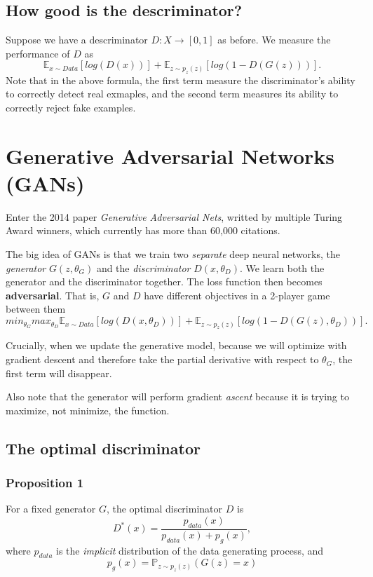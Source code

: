 \documentclass[titlepage, 12pt, leqno]{article}
\begin{document}
\subsection{How good is the descriminator?}
Suppose we have a descriminator $D:X \rightarrow [0,1]$ as before. We measure
the performance of $D$ as
\[
    \mathbb{E}_{x \sim Data}[log(D(x))]+\mathbb{E}_{z \sim p_{z}(z)}[log(1 - D(G(z)))].
\]
Note that in the above formula, the first term measure the discriminator's
ability to correctly detect real exmaples, and the second term measures its
ability to correctly reject fake examples.

\pagebreak
\section{Generative Adversarial Networks (GANs)}
Enter the 2014 paper \textit{Generative Adversarial Nets}, writted by multiple
Turing Award winners, which currently has more than 60,000 citations.

The big idea of GANs is that we train two \textit{separate} deep neural networks,
the \textit{generator} $G(z,\theta_{G})$ and the \textit{discriminator}
$D(x,\theta_{D})$. We learn both the generator and the discriminator together. 
The loss function then becomes \textbf{adversarial}. That is, $G$ and $D$ have
different objectives in a 2-player game between them
\[
min_{\theta_{G}}max_{\theta_{D}} \mathbb{E}_{x \sim Data}[log(D(x, 
\theta_{D}))]+\mathbb{E}_{z \sim p_{z}(z)}[log(1 - D(G(z), \theta_{D}))].
\]

\begin{note}
Crucially, when we update the generative model, because we will optimize with
gradient descent and therefore take the partial derivative with respect to
$\theta_{G}$, the first term will disappear.
\end{note}

\begin{note}
    Also note that the generator will perform gradient \textit{ascent} because
    it is trying to maximize, not minimize, the function.
\end{note}

\subsection{The optimal discriminator}
\subsubsection{Proposition 1}
For a fixed generator $G$, the optimal discriminator $D$ is
\[
D^{*}(x) = \frac{p_{data}(x)}{p_{data}(x) + p_{g}(x)},
\]
where $p_{data}$ is the \textit{implicit} distribution of the data generating
process, and 
\[
p_{g}(x) = \mathbb{P}_{z \sim p_{z}(z)}(G(z) = x)
\]
\end{document}
